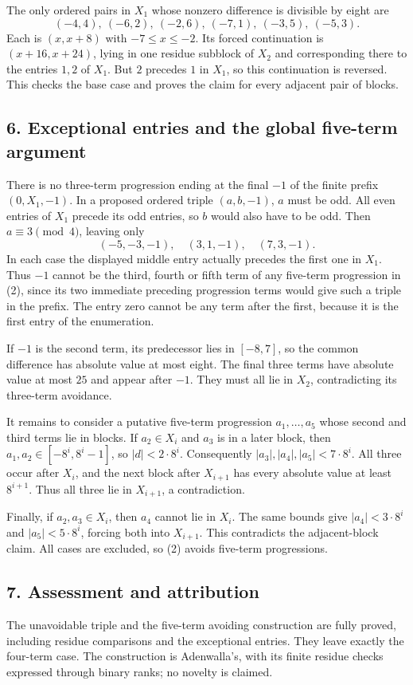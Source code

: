 The only ordered pairs in $X_1$ whose nonzero difference is divisible by eight are
\[
 (-4,4),\ (-6,2),\ (-2,6),\ (-7,1),\ (-3,5),\ (-5,3).
\]
Each is $(x,x+8)$ with $-7\le x\le-2$. Its forced continuation is $(x+16,x+24)$, lying in one residue subblock of $X_2$ and corresponding there to the entries $1,2$ of $X_1$. But $2$ precedes $1$ in $X_1$, so this continuation is reversed. This checks the base case and proves the claim for every adjacent pair of blocks.

\subsection*{6. Exceptional entries and the global five-term argument}
There is no three-term progression ending at the final $-1$ of the finite prefix $(0,X_1,-1)$. In a proposed ordered triple $(a,b,-1)$, $a$ must be odd. All even entries of $X_1$ precede its odd entries, so $b$ would also have to be odd. Then $a\equiv3\pmod4$, leaving only
\[
 (-5,-3,-1),\quad(3,1,-1),\quad(7,3,-1).
\]
In each case the displayed middle entry actually precedes the first one in $X_1$. Thus $-1$ cannot be the third, fourth or fifth term of any five-term progression in (2), since its two immediate preceding progression terms would give such a triple in the prefix. The entry zero cannot be any term after the first, because it is the first entry of the enumeration.

If $-1$ is the second term, its predecessor lies in $[-8,7]$, so the common difference has absolute value at most eight. The final three terms have absolute value at most $25$ and appear after $-1$. They must all lie in $X_2$, contradicting its three-term avoidance.

It remains to consider a putative five-term progression $a_1,\ldots,a_5$ whose second and third terms lie in blocks. If $a_2\in X_i$ and $a_3$ is in a later block, then $a_1,a_2\in[-8^i,8^i-1]$, so $|d|<2\cdot8^i$. Consequently $|a_3|,|a_4|,|a_5|<7\cdot8^i$. All three occur after $X_i$, and the next block after $X_{i+1}$ has every absolute value at least $8^{i+1}$. Thus all three lie in $X_{i+1}$, a contradiction.

Finally, if $a_2,a_3\in X_i$, then $a_4$ cannot lie in $X_i$. The same bounds give $|a_4|<3\cdot8^i$ and $|a_5|<5\cdot8^i$, forcing both into $X_{i+1}$. This contradicts the adjacent-block claim. All cases are excluded, so (2) avoids five-term progressions.

\subsection*{7. Assessment and attribution}
The unavoidable triple and the five-term avoiding construction are fully proved, including residue comparisons and the exceptional entries. They leave exactly the four-term case. The construction is Adenwalla's, with its finite residue checks expressed through binary ranks; no novelty is claimed.

